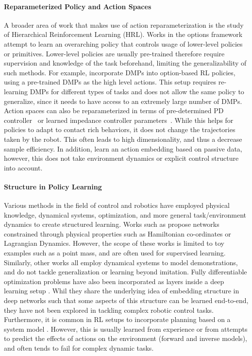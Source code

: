 \documentclass{article}
\begin{document}
\paragraph{Reparameterized Policy and Action Spaces}
A broader area of work that makes use of action reparameterization is the study of Hierarchical Reinforcement Learning (HRL). Works in the options framework \cite{bacon2017option, sutton1999temporal} attempt to learn an overarching policy that controls usage of lower-level policies or primitives. Lower-level policies are usually pre-trained therefore require supervision and knowledge of the task beforehand, limiting the generalizability of such methods. For example, \citet{daniel2016hreps, parisi2015tetherball} incorporate DMPs into option-based RL policies, using a pre-trained DMPs as the high level actions. This setup requires re-learning DMPs for different types of tasks and does not allow the same policy to generalize, since it needs to have access to an extremely large number of DMPs. Action spaces can also be reparameterized in terms of pre-determined PD controller~\cite{yuan2019ego} or learned impedance controller parameters~\cite{vices2019martin}. While this helps for policies to adapt to contact rich behaviors, it does not change the trajectories taken by the robot. This often leads to high dimensionality, and thus a decrease sample efficiency. In addition, \citet{whitney2019dynamics} learn an action embedding based on passive data, however, this does not take environment dynamics or explicit control structure into account.

\paragraph{Structure in Policy Learning}
Various methods in the field of control and robotics have employed physical knowledge, dynamical systems, optimization, and more general task/environment dynamics to create structured learning. Works such as \cite{cranmer2020lagrangian, greydanus2019hamiltonian} propose networks constrained through physical properties such as Hamiltonian co-ordinates or Lagrangian Dynamics. However, the scope of these works is limited to toy examples such as a point mass, and are often used for supervised learning. Similarly, other works \cite{rana2020euclideanizing, ravichandar2017demonstration, perrin2016fastdiffeomorphic, neumann2015diffeomorphic} all employ dynamical systems to model demonstrations, and do not tackle generalization or learning beyond imitation. Fully differentiable optimization problems have also been incorporated as layers inside a deep learning setup \cite{amos2017optnet,chen2018neural,amos2019diffmpc}. Whil they share the underlying idea of embedding structure in deep networks such that some aspects of this structure can be learned end-to-end, they have not been explored in tackling complex robotic control tasks. Furthermore, it is common in RL setups to incorporate planning based on a system model \cite{deisenroth2011pilco, Deisenroth_2015, chua2018deep, Atkeson97acomparison, deisenroth2013policy}. However, this is usually learned from experience or from attempts to predict the effects of actions on the environment (forward and inverse models), and often tends to fail for complex dynamic tasks.
\end{document}
